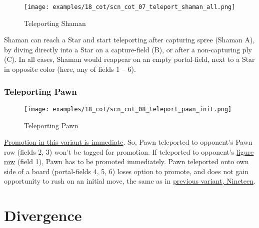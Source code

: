 \vspace*{-1.4\baselineskip}
\noindent
\begin{figure}[!h]
\texttt{[image: examples/18\_cot/scn\_cot\_07\_teleport\_shaman\_all.png]}
\caption{Teleporting Shaman}
\label{fig:scn_cot_07_teleport_shaman_all}
\end{figure}

Shaman can reach a Star and start teleporting after capturing spree (Shaman A),
by diving directly into a Star on a capture-field (B), or after a non-capturing
ply (C). In all cases, Shaman would reappear on an empty portal-field, next to a
Star in opposite color (here, any of fields 1 -- 6).

\clearpage %

\subsubsection*{Teleporting Pawn}
\label{sec:Conquest of Tlalocan/Shaman/Movement/Teleporting Pawn}

\vspace*{-1.4\baselineskip}
\noindent
\begin{figure}[!h]
\texttt{[image: examples/18\_cot/scn\_cot\_08\_teleport\_pawn\_init.png]}
\caption{Teleporting Pawn}
\label{fig:scn_cot_08_teleport_pawn_init}
\end{figure}

\hyperref[sec:Conquest of Tlalocan/Promotion]{Promotion in this variant is immediate}.
So, Pawn teleported to opponent's Pawn row (fields 2, 3) won't be tagged for promotion.
If teleported to opponent's \hyperref[sec:Terms/Figure row]{figure row} (field 1),
Pawn has to be promoted immediately.
Pawn teleported onto own side of a board (portal-fields 4, 5, 6) loses option to
promote, and does not gain opportunity to rush on an initial move, the same as in
\hyperref[fig:scn_n_12_teleport_pawns_step_1]{previous variant, Nineteen}.

\clearpage %

\section*{Divergence}
\label{sec:Conquest of Tlalocan/Divergence}

